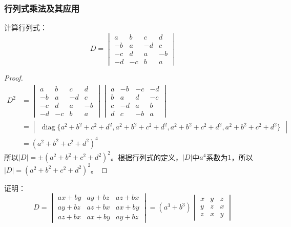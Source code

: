 \subsubsection{行列式乘法及其应用}
\begin{theorem}
	计算行列式：
	\begin{equation*}
		D=
		\begin{vmatrix}
			a & b & c & d \\
			-b & a & -d  & c \\
			-c & d & a & -b \\
			-d & -c & b & a
		\end{vmatrix}
	\end{equation*}
\end{theorem}
\begin{proof}
	\begin{align*}
		D^2&=
		\begin{vmatrix}
			a & b & c & d \\
			-b & a & -d  & c \\
			-c & d & a & -b \\
			-d & -c & b & a
		\end{vmatrix}
		\begin{vmatrix}
			a & -b & -c & -d \\
			b & a & d  & -c \\
			c & -d & a & b \\
			d & c & -b & a
		\end{vmatrix} \\
		&=
		\begin{vmatrix}
			\operatorname{diag}\{a^2+b^2+c^2+d^2,a^2+b^2+c^2+d^2,a^2+b^2+c^2+d^2,a^2+b^2+c^2+d^2\}
		\end{vmatrix} \\
		&=(a^2+b^2+c^2+d^2)^4
	\end{align*}
	所以$|D|=\pm(a^2+b^2+c^2+d^2)^2$。根据行列式的定义，$|D|$中$a^4$系数为$1$，所以$|D|=(a^2+b^2+c^2+d^2)^2$。
\end{proof}
\begin{theorem}
	证明：
	\begin{equation*}
		D=
		\begin{vmatrix}
			ax+by & ay+bz & az+bx \\
			ay+bz & az+bx & ax+by \\
			az+bx & ax+by & ay+bz
		\end{vmatrix}
		=(a^3+b^3)
		\begin{vmatrix}
			x & y & z \\
			y & z & x \\
			z & x & y
		\end{vmatrix}
	\end{equation*}
\end{theorem}
